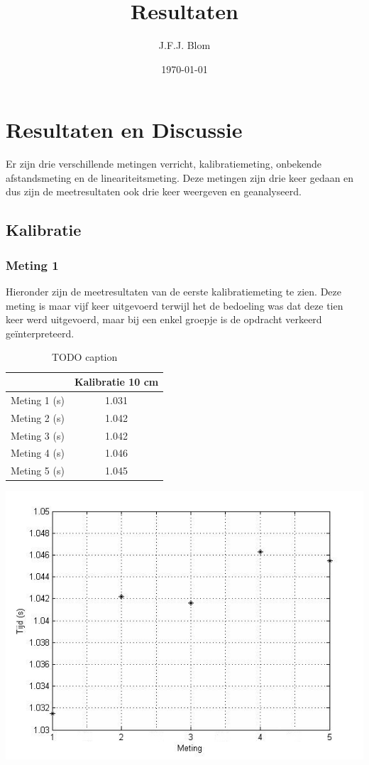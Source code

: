 \documentclass{report}
\title{Resultaten}
\author{J.F.J. Blom}
\date{\today}
\begin{document}
\section*{Resultaten en Discussie}
Er zijn drie verschillende metingen verricht, kalibratiemeting, onbekende afstandsmeting en de lineariteitsmeting. Deze metingen zijn drie keer gedaan en dus zijn de meetresultaten ook drie keer weergeven en geanalyseerd.
\subsection*{Kalibratie}
\subsubsection*{Meting 1}
Hieronder zijn de meetresultaten van de eerste kalibratiemeting te zien. Deze meting is maar vijf keer uitgevoerd terwijl het de bedoeling was dat deze tien keer werd uitgevoerd, maar bij een enkel groepje is de opdracht verkeerd geïnterpreteerd.

\begin{table}
\begin{center}
\begin{tabular}{| l| c|}
\hline
    & Kalibratie 10 cm \\
\hline
   Meting 1 (s) & 1.031 \\
\hline
   Meting 2 (s) & 1.042 \\
\hline
   Meting 3 (s) & 1.042 \\
\hline
   Meting 4 (s) & 1.046 \\
\hline
   Meting 5 (s) & 1.045 \\
\hline
\end{tabular}
\caption{TODO caption}
\end{center}
\end{table}

\begin{center}
\includegraphics[width=150mm] {grafiekmeetresultaten1.jpg}
\end{center}
\end{document}
